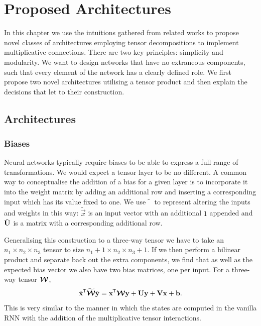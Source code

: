 
\chapter{Proposed Architectures}\label{C:arch}
In this chapter we use the intuitions gathered from related works to propose novel classes of
architectures employing tensor decompositions to implement multiplicative connections. There are
two key principles: simplicity and modularity. We want to design networks that have no extraneous
components, such that every element of the network has a clearly defined role. We first propose
two novel architectures utilising a tensor product and then explain the decisions that let to their
construction.

\section{Architectures}
\subsection{Biases}
Neural networks typically require biases to be able to express a full range of transformations. We would
expect a tensor layer to be no different. A common way to conceptualise the addition of a bias for a
given layer is to incorporate it into the weight matrix by adding an additional row and inserting a
corresponding input which has its value fixed to one. 
We use \(\tilde{\phantom{x}}\) to represent altering the inputs
and weights in this way: \(\tilde{\vec{x}}\) is an input vector with an additional \(1\) appended
and \(\tilde{\mathbf{U}}\) is a matrix with a corresponding additional row.

Generalising this construction to a three-way tensor we have to take an \(n_1 \times n_2 \times n_3\)
tensor to size \(n_1 + 1 \times n_2 \times n_3 +1\). If we then perform a bilinear product and separate
back out the extra components, we find that as well as the expected bias vector we also have
two bias matrices, one per input. For a three-way tensor \(\bm{\mathcal{W}}\),
\begin{equation}\label{eq:tensorbias}
	\tilde{\mathbf{x}}^{\mkern-1.5mu\mathsf{T}}\widetilde{\bm{\mathcal{W}}}\tilde{\mathbf{y}}
	= \mathbf{x}^{\mkern-1.5mu\mathsf{T}}\bm{\mathcal{W}}\mathbf{y} + \mathbf{U}\mathbf{y} + \mathbf{V}\mathbf{x} + \mathbf{b}.
\end{equation} This is very similar to the manner in which the states are computed in the vanilla
RNN with the addition of the multiplicative tensor interactions.

